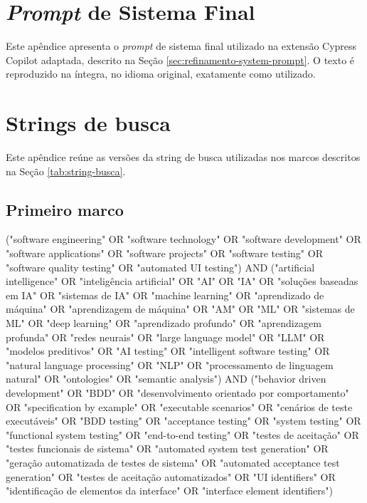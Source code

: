 \begin{apendicesenv}

\partapendices

\chapter{\textit{Prompt} de Sistema Final}
\label{ap:system-prompt}

Este apêndice apresenta o \textit{prompt} de sistema final utilizado na extensão Cypress Copilot adaptada, descrito na Seção \ref{sec:refinamento-system-prompt}. O texto é reproduzido na íntegra, no idioma original, exatamente como utilizado.

{\footnotesize
{}
}
\chapter{Strings de busca}
\label{ap:string-busca}

Este apêndice reúne as versões da string de busca utilizadas nos marcos descritos na Seção \ref{tab:string-busca}.

\section{Primeiro marco}
\label{ap:string-marco-1}
\begingroup
\small\ttfamily
("software engineering" OR "software technology" OR "software development" OR "software applications" OR "software projects" OR "software testing" OR "software quality testing" OR "automated UI testing") AND ("artificial intelligence" OR "inteligência artificial" OR "AI" OR "IA" OR "soluções baseadas em IA" OR "sistemas de IA" OR "machine learning" OR "aprendizado de máquina" OR "aprendizagem de máquina" OR "AM" OR "ML" OR "sistemas de ML" OR "deep learning" OR "aprendizado profundo" OR "aprendizagem profunda" OR "redes neurais" OR "large language model" OR "LLM" OR "modelos preditivos" OR "AI testing" OR "intelligent software testing" OR "natural language processing" OR "NLP" OR "processamento de linguagem natural" OR "ontologies" OR "semantic analysis") AND ("behavior driven development" OR "BDD" OR "desenvolvimento orientado por comportamento" OR "specification by example" OR "executable scenarios" OR "cenários de teste executáveis" OR "BDD testing" OR "acceptance testing" OR "system testing" OR "functional system testing" OR "end-to-end testing" OR "testes de aceitação" OR "testes funcionais de sistema" OR "automated system test generation" OR "geração automatizada de testes de sistema" OR "automated acceptance test generation" OR "testes de aceitação automatizados" OR "UI identifiers" OR "identificação de elementos da interface" OR "interface element identifiers")
\par
\endgroup


\end{apendicesenv}
